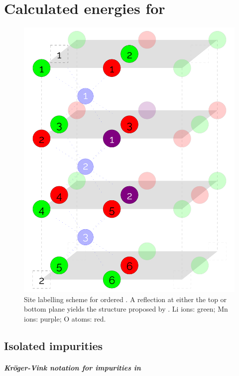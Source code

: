 \chapter{Calculated energies for }

\begin{figure}[h]
\centering
\includegraphics[height = 0.5\textheight]{figures/orderedlabels/orderedlabels}
\caption[Repetition of Figure \ref{fig:orderedlabel} for convenience]{Site labelling scheme for ordered . A reflection at either the top or bottom plane yields the structure proposed by \citet{Diaz-Lopez2017}. Li ions: green; Mn ions: purple; O atoms: red.
}
\end{figure}

\newpage
\newpage
\section{Isolated impurities}
\paragraph{{\color{red}Kr\"oger-Vink notation for impurities in }}


